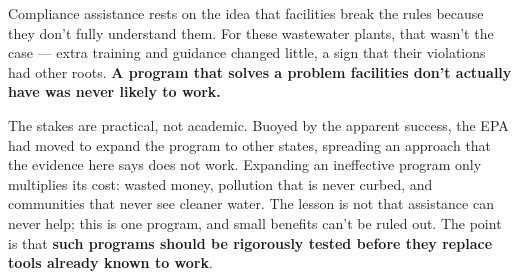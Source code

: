 \documentclass[
  11pt,
]{article}
\newcommand{\sectionhead}[1]{%
  \vspace{2pt}{\color{ink}\bfseries\fontsize{9.75pt}{12pt}\selectfont
  \textls[20]{\MakeUppercase{#1}}\par}\vspace{1pt}}
\begin{document}
\sectionhead{Takeaway}
\noindent Compliance assistance rests on the idea that facilities break the rules because they don't fully understand them. For these wastewater plants, that wasn't the case --- extra training and guidance changed little, a sign that their violations had other roots. \textbf{A program that solves a problem facilities don't actually have was never likely to work.}

\vspace{4pt}

\noindent The stakes are practical, not academic. Buoyed by the apparent success, the EPA had moved to expand the program to other states, spreading an approach that the evidence here says does not work. Expanding an ineffective program only multiplies its cost: wasted money, pollution that is never curbed, and communities that never see cleaner water. The lesson is not that assistance can never help; this is one program, and small benefits can't be ruled out. The point is that \textbf{such programs should be rigorously tested before they replace tools already known to work}.
\end{document}
